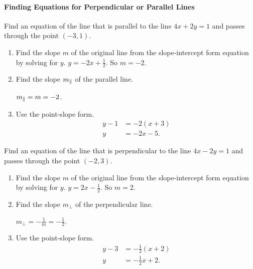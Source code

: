 \paragraph*{Finding Equations for Perpendicular or Parallel Lines}
\mbox{}

		\begin{example}
			Find an equation of the line that is parallel to the line $4x+2y=1$ and passes through the point $(-3, 1)$.
		\end{example}
		
		\begin{solution}
			\begin{enumerate}[label={\textbf{\textup{Step \arabic*.}}~}, itemsep=0em]
				\item Find the slope $m$ of the original line from the slope-intercept form equation by solving for $y$.  $y=-2x+\frac12$. So $m=-2$.
				\item Find the slope $m_{\mathbin{\parallel}}$ of the parallel line.\\ \centerline{$m_{\mathbin{\parallel}}=m=-2$.}
				\item Use the point-slope form.
				      \[
					      \begin{split}
						      y-1&=-2(x+3)\\
						      y&=-2x-5.
					      \end{split}
				      \]
			\end{enumerate}

		\end{solution}

		\begin{example}
			Find an equation of the line that is perpendicular to the line $4x-2y=1$ and passes through the point $(-2,3)$.
		\end{example}
		
		\begin{solution}
			\begin{enumerate}[label={\textbf{\textup{Step \arabic*.}}~}, itemsep=0em]
				\item Find the slope $m$ of the original line from the slope-intercept form equation by solving for $y$.  $y=2x-\frac12$. So $m=2$.
				\item Find the slope $m_\perp$ of the perpendicular line.\\ \centerline{$m_\perp=-\frac1m=-\frac12$.}
				\item Use the point-slope form.
				      \[
					      \begin{split}
						      y-3&=-\frac12(x+2)\\
						      y&=-\frac{1}{2}x+2.
					      \end{split}
				      \]
			\end{enumerate}

		\end{solution}


